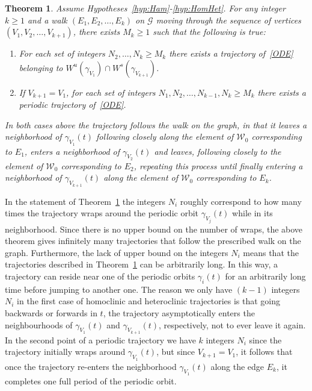 \documentclass[11pt]{article}
\newcommand{\W}{\mathcal{W}}
\numberwithin{equation}{section}
\theoremstyle{plain}
\newtheorem{theorem}{Theorem}[section]
\begin{document}
\begin{theorem}\label{thm:Main} %
Assume Hypotheses~\ref{hyp:Ham}-\ref{hyp:HomHet}. For any integer $k \geq 1$ and a walk $(E_1,E_2,\dots,E_k)$ on $\mathcal{G}$ moving through the sequence of vertices $(V_1,V_2,\dots,V_{k+1})$, there exists $M_k \geq 1$ such that the following is true:
\begin{enumerate}
	\item For each set of integers $N_2,\dots,N_k \geq M_k$ there exists a trajectory of~\eqref{ODE} belonging to $W^u(\gamma_{V_1})\cap W^s(\gamma_{V_{k+1}})$. 
	\item If $V_{k+1} = V_1$, for each set of integers $N_1,N_2,\dots,N_{k-1},N_k \geq M_k$ there exists a periodic trajectory of~\eqref{ODE}.   
\end{enumerate}
In both cases above the trajectory follows the walk on the graph, in that it leaves a neighborhood of $\gamma_{V_1}(t)$ following closely along the element of $\W_0$ corresponding to $E_1$, enters a neighborhood of $\gamma_{V_2}(t)$ and leaves, following closely to the element of $\W_0$ corresponding to $E_2$, repeating this process until finally entering a neighborhood of $\gamma_{V_{k+1}}(t)$ along the element of $\W_0$ corresponding to $E_k$. 
\end{theorem}

In the statement of Theorem~\ref{thm:Main} the integers $N_i$ roughly correspond to how many times the trajectory wraps around the periodic orbit $\gamma_{V_j}(t)$ while in its neighborhood. Since there is no upper bound on the number of wraps, the above theorem gives infinitely many trajectories that follow the prescribed walk on the graph. Furthermore, the lack of upper bound on the integers $N_i$ means that the trajectories described in Theorem~\ref{thm:Main} can be arbitrarily long. In this way, a trajectory can reside near one of the periodic orbits $\gamma_i(t)$ for an arbitrarily long time before jumping to another one. The reason we only have $(k-1)$ integers $N_i$ in the first case of homoclinic and heteroclinic trajectories is that going backwards or forwards in $t$, the trajectory asymptotically enters the neighbourhoods of $\gamma_{V_1}(t)$ and $\gamma_{V_{k+1}}(t)$, respectively, not to ever leave it again. In the second point of a periodic trajectory we have $k$ integers $N_i$ since the trajectory initially wraps around $\gamma_{V_1}(t)$, but since $V_{k+1} = V_1$, it follows that once the trajectory re-enters the neighborhood $\gamma_{V_1}(t)$ along the edge $E_k$, it completes one full period of the periodic orbit.    
\end{document}
